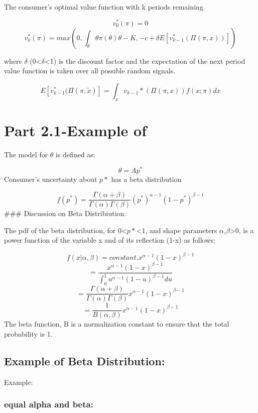\documentclass[
]{book}
\begin{document}
The consumer's optimal value function with k periods remaining

\[v^{*}_{0}(\pi) = 0\]
\[v^{*}_{k}(\pi)=max(0,\int_{\theta}\theta\pi(\theta) \theta -K , -c + \delta E[v^{*}_{k-1}(\Pi(\pi,x))])\]

where \(\delta\) (0\textless{}\(\delta\)\textless1) is the discount factor and the expectation of the next period value function is taken over all possible random signals.

\[E[v^{*}_{k-1}(\Pi(\pi, \tilde{x})]=\int_{x}v_{k-1}{*}(\Pi(\pi,x))f(x;\pi)dx\]

\hypertarget{part-2.1-example-of}{%
\section{Part 2.1-Example of}\label{part-2.1-example-of}}

The model for \(\theta\) is defined as:

\[\theta=Ap^*\]
Consumer's uncertainty about \(p*\) has a beta distribution

\[f(p^*) = \frac{\Gamma(\alpha + \beta)}{\Gamma(\alpha)\Gamma(\beta)}(p^*)^{\alpha-1}(1-p^*)^{\beta-1}\]
\#\#\# Discussion on Beta Distribiution:

The pdf of the beta distribution, for 0\textless{}\(p*\)\textless1, and shape parameters \(\alpha\),\(\beta\)\textgreater0, is a power function of the variable x and of its reflection (1-x) as follows:

\[f(x|\alpha,\beta) = constant.x^{\alpha-1}(1-x)^{\beta-1}\]
\[=\frac{x^{\alpha-1}(1-x)^{\beta-1}}{\int_{0}^{1}u^{\alpha-1}(1-u)^{\beta-1}du}\]
\[=\frac{\Gamma(\alpha + \beta)}{\Gamma(\alpha)\Gamma(\beta)}x^{\alpha-1}(1-x)^{\beta-1}\]
\[= \frac{1}{B(\alpha,\beta)}x^{\alpha-1}(1-x)^{\beta-1}\]
The beta function, B is a normalization constant to ensure that the total probability is 1.

\hypertarget{example-of-beta-distribution}{%
\subsection{Example of Beta Distribution:}\label{example-of-beta-distribution}}

Example:

\hypertarget{equal-alpha-and-beta}{%
\subsubsection{equal alpha and beta:}\label{equal-alpha-and-beta}}
\end{document}
